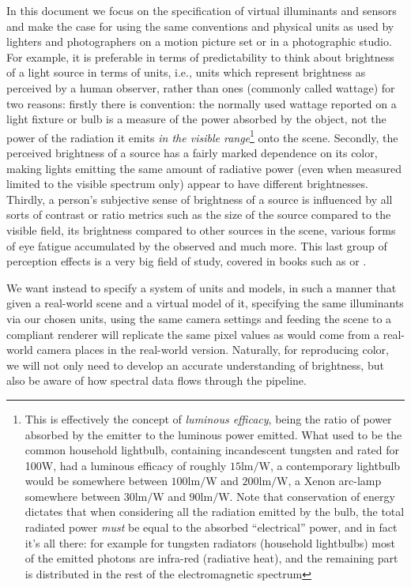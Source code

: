 In this document we focus on the specification of \gls{virtual} \glspl{illuminant} and
\glspl{sensor} and make the case for using the same conventions and physical units as
used by lighters and photographers on a motion picture set or in a photographic studio. 
For example, it is preferable in terms of predictability to think about brightness of a 
light source in terms of  units, i.e., units which represent brightness as
perceived by a \gls{human observer}, rather than  ones 
(commonly called \gls{wattage}) for two reasons: 
firstly there is convention: the normally used wattage reported on a light fixture or bulb 
is a measure of the power absorbed by the object, not the power of the radiation it emits 
\emph{in the visible range}\footnote{This is effectively the concept of  
	\textsl{\gls{luminous efficacy}}, being the ratio of power absorbed by the emitter
	to the luminous power emitted. 
	What used to be the common household lightbulb, containing incandescent tungsten and 
	rated for 100W, had a luminous efficacy of roughly $15\unit{\lumen\per\watt}$, 
	a contemporary  lightbulb would be somewhere between 
	$100\unit{\lumen\per\watt}$ and $200\unit{\lumen\per\watt}$, 
	a Xenon arc-lamp somewhere between $30\unit{\lumen\per\watt}$ and
	$90\unit{\lumen\per\watt}$. 
	Note that conservation of energy dictates that when considering all the
	radiation emitted by the bulb, the total radiated power \emph{must} be equal 
	to the absorbed ``electrical'' power, and in fact it's all there: for example for
	tungsten radiators (household lightbulbs) most of the emitted
	photons are infra-red (radiative heat), and the remaining part is distributed in the rest of
	the electromagnetic spectrum} onto the \gls{scene}. 
Secondly, the perceived \gls{brightness} of a source has a fairly marked dependence on 
its color, making lights emitting the same amount of radiative power (even when measured 
limited to the visible spectrum only) appear to have different brightnesses. 
Thirdly, a person's subjective sense of brightness of a source is influenced by all sorts
of contrast or ratio metrics such as the size of the source compared to the visible field,
its brightness compared to other sources in the scene, various forms of eye fatigue accumulated
by the observed and much more. This last group of perception effects is a very big field of
study, covered in books such as \cite{wyszecki82} or \cite{fairchild2013}.

We want instead to specify a system of units and models, in such a manner that
given a real-world scene and a virtual model of it,
specifying the same illuminants via our chosen units, using the same
camera settings and feeding the scene to a compliant renderer will replicate 
the same pixel values as would come from a real-world camera places in the 
real-world version. 
Naturally, for reproducing color, we will not only need
to develop an accurate understanding of brightness, but also be aware
of how \gls{spectral} data flows through the \gls{pipeline}.



